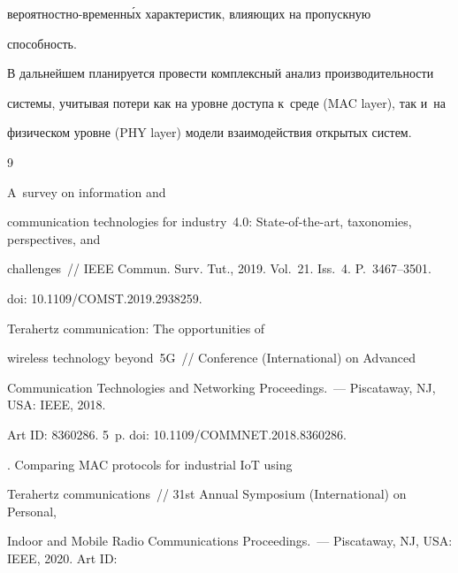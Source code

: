 ве\-ро\-ят\-ност\-но-вре\-мен\-н\'{ы}х характеристик, влияющих на пропускную 


способность. 


    


В дальнейшем планируется провести комплексный анализ про\-из\-во\-ди\-тель\-ности 


системы, учитывая потери как на уровне доступа к~среде (MAC layer), так и~на 


физическом уровне (PHY layer) модели взаимодействия открытых систем.





{\small\frenchspacing


{%




\begin{thebibliography}{9}




 A~survey on information and 


communication technologies for industry~4.0: State-of-the-art, taxonomies, perspectives, and 


challenges~/\!\!/ IEEE Commun. Surv. Tut., 2019. Vol.~21. Iss.~4. P.~3467--3501. 


doi: 10.1109\!/\!COMST.2019.2938259.







 Terahertz communication: The opportunities of 


wireless technology beyond~5G~/\!\!/ Conference (International) on Advanced 


Communication Technologies and Networking Proceedings.~--- Piscataway, NJ, USA: IEEE, 2018. 


Art ID: 8360286. 5~p. doi: 10.1109\!/\!COMMNET.2018.8360286.







. Comparing MAC protocols for industrial IoT using 


Terahertz communications~/\!\!/ 31st Annual  Symposium (International) on Personal, 


Indoor and Mobile Radio Communications Proceedings.~--- Piscataway, NJ, USA: IEEE, 2020. Art ID: 



\end{thebibliography}}}
